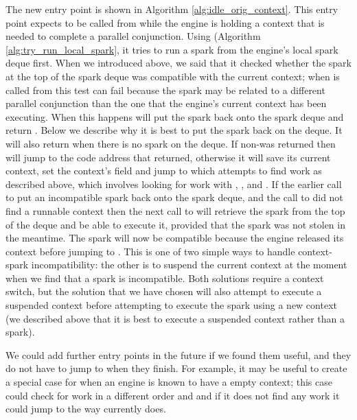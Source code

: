 The new entry point \idleorigcontext is shown in Algorithm
\ref{alg:idle_orig_context}.
This entry point expects to be called from \joinandcontinue while the engine
is holding a context that is needed to complete a parallel conjunction.
Using \tryrunlocalspark (Algorithm \ref{alg:try_run_local_spark},
it tries to run a spark from the engine's local spark deque first.
When we introduced \tryrunlocalspark above,
we said that it checked whether the spark at the top of the spark deque was
compatible with the current context;
when \tryrunlocalspark is called from \idleorigcontext this test can fail
because the spark may be related to a different parallel conjunction than
the one that the engine's current context has been executing.
When this happens \tryrunlocalspark will put the spark back onto the spark
deque and return \NULL.
Below we describe why it is best to put the spark back on the deque.
It will also return \NULL when there is no spark on the deque.
If non-\NULL was returned then \idleorigcontext will jump to the code
address that \tryrunlocalspark returned,
otherwise it will save its current context,
set the context's  field
and jump to \idle which attempts to find work as described above,
which involves looking for work with \tryruncontext, \tryrunlocalspark, and
\trystealspark.
If the earlier call to \tryrunlocalspark put an incompatible spark back onto
the spark deque,
and the call to \tryruncontext did not find a runnable context then
the next call to \tryrunlocalspark
will retrieve the spark from the top of the deque and be able to execute it,
provided that the spark was not stolen in the meantime.
The spark will now be compatible because the engine released its context
before jumping to \idle.
This is one of two simple ways to handle context-spark incompatibility:
the other is to suspend the current context at the moment when we find that
a spark is incompatible.
Both solutions require a context switch,
but the solution that we have chosen will also attempt to execute a
suspended context before attempting to execute the spark using a new context
(we described above that it is best to execute a suspended context rather
than a spark).

We could add further entry points in the future if we found them useful,
and they do not have to jump to \idle when they finish.
For example,
it may be useful to create a special case for when an engine is known to
have a empty context;
this case could check for work in a different order and and if it does not
find any work it could jump to \sleep the way \idle currently does.

